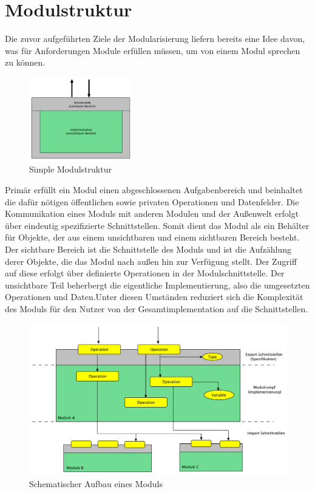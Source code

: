   \section{Modulstruktur}
      Die zuvor aufgeführten Ziele der Modularisierung liefern bereits eine Idee davon, was für Anforderungen Module erfüllen müssen, um von einem Modul sprechen zu können. 
        \begin{figure}[h!] 
        \centering
        \includegraphics[width=0.4\textwidth]{material/images/simple-module.pdf}
        \caption{Simple Modulstruktur \cite{modulMitJava9}}
        \label{fig:simple-module}
      \end{figure}
    Primär erfüllt ein Modul einen abgeschlossenen Aufgabenbereich und beinhaltet die dafür nötigen öffentlichen sowie privaten Operationen und Datenfelder. Die Kommunikation eines Moduls mit anderen Modulen und der Außenwelt erfolgt über eindeutig spezifizierte Schnittstellen.\newline
    Somit dient das Modul als ein Behälter für Objekte, der aus einem unsichtbaren und einem sichtbaren Bereich besteht. Der sichtbare Bereich ist die Schnittstelle des Moduls und ist die Aufzählung derer Objekte, die das Modul nach außen hin zur Verfügung stellt. Der Zugriff auf diese erfolgt über definierte Operationen in der Modulschnittstelle. Der unsichtbare Teil beherbergt die eigentliche Implementierung, also die umgesetzten Operationen und Daten.Unter diesen Umständen reduziert sich die Komplexität des Moduls für den Nutzer von der Gesamtimplementation auf die Schnittstellen. \cite{javaMod9,java9modRevealed,explorJava9,modulMitJava9}

      \begin{figure}[h!]
        \centering
        \includegraphics[width=\textwidth]{material/images/Module-workflow.pdf}
        \caption{Schematischer Aufbau eines Moduls \cite{modulMitJava9}}
        \label{fig:mw}
      \end{figure} 


